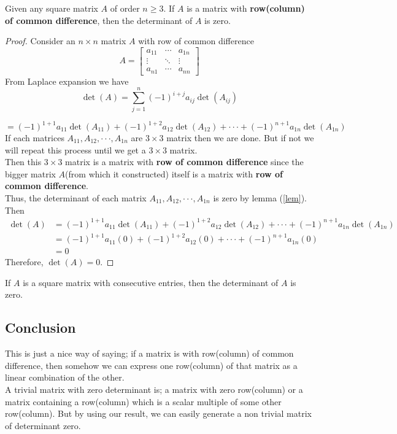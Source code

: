 \documentclass[12pt]{article}
\theoremstyle{definition}
\theoremstyle{remark}
\newcounter{theorem}
\newcounter{lemma}
\newenvironment{theorem}[1][]
  {\begin{theor}[mynote=#1]}
  {\end{theor}}
\begin{document}
\begin{theorem}[Zero determinant Theorem]
Given any square matrix $A$ of order $n\ge3$. If $A$ is a matrix with \textbf{row(column) of common difference}, then the determinant of $A$ is zero.
\end{theorem}

\begin{proof}
Consider an $n\times n$ matrix $A$ with row of common difference
\[
  A =\begin{bmatrix}
      a_{11}  & \cdots & a_{1n} \\
      \vdots  & \ddots & \vdots \\
      a_{n1}  & \cdots & a_{nn}
    \end{bmatrix}
\]
From Laplace expansion we have
$$
 \det(A)= \sum_{j=1}^n (-1)^{i+j} a_{ij} \det(A_{ij})
$$

$$
=(-1)^{1+1} a_{11} \det(A_{11})+(-1)^{1+2} a_{12} \det(A_{12})+\cdot\cdot\cdot+(-1)^{n+1} a_{1n} \det(A_{1n})
$$
If each matrices $A_{11},A_{12},\cdot\cdot\cdot,A_{1n}$ are $3\times3$ matrix then we are done. But if not we will repeat this process until we get a $3\times3$ matrix.\\
Then this $3\times3$ matrix is a matrix with \textbf{row of common difference} since the bigger matrix $A$(from which it constructed) itself is a matrix with \textbf{row of common difference}.\\
Thus, the determinant of each matrix $A_{11},A_{12},\cdot\cdot\cdot,A_{1n}$ is zero by lemma (\ref{lem}). Then
\begin{align*}
\det(A)&=(-1)^{1+1} a_{11} \det(A_{11})+(-1)^{1+2} a_{12} \det(A_{12})+\cdot\cdot\cdot+(-1)^{n+1} a_{1n} \det(A_{1n})\\
&=(-1)^{1+1} a_{11} (0)+(-1)^{1+2} a_{12} (0)+\cdot\cdot\cdot+(-1)^{n+1} a_{1n} (0)\\
&=0
\end{align*}
Therefore, $\det(A)=0$.
\end{proof}

\begin{coro}
If $A$ is a square matrix with consecutive entries, then the determinant of $A$ is zero.
\end{coro}

\subsection*{Conclusion}
This is just a nice way of saying; if a matrix is with row(column) of common difference, then somehow we can express one row(column) of that matrix as a linear combination of the other.\\
A trivial matrix with zero determinant is; a matrix with zero row(column) or a matrix containing a row(column) which is a scalar multiple of some other row(column). But by using our result, we can easily generate a non trivial matrix of determinant zero.
\end{document}
